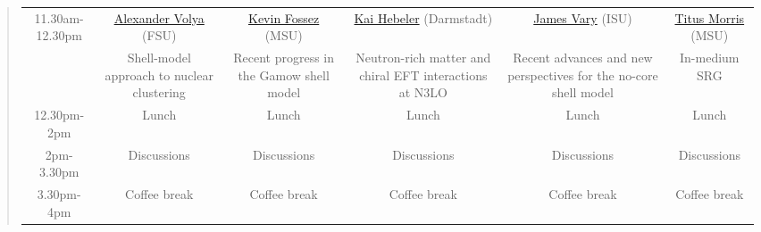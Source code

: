\documentclass[%
twoside,                 %
final,                   %
10pt]{article}
\begin{document}
\begin{quote}
\begin{tabular}{cccccc}
\hline
11.30am-12.30pm & \href{{http://www.physics.fsu.edu/people/Personnel.asp?fn=Alexander&ln=Volya&mn=}}{Alexander Volya} (FSU) & \href{{http://nscl.msu.edu/directory/index.php?initial=F}}{Kevin Fossez} (MSU)            & \href{{http://theorie.ikp.physik.tu-darmstadt.de/strongint/people_hebeler.html}}{Kai Hebeler} (Darmstadt) & \href{{http://www.public.iastate.edu/~jvary/}}{James Vary} (ISU)                & \href{{http://www.pa.msu.edu/profile/morri502}}{Titus Morris} (MSU)                                    \\
                & Shell-model approach to nuclear clustering                                                                & Recent progress in the Gamow shell model                                                  & Neutron-rich matter and chiral EFT interactions at N3LO                                                   & Recent advances and new perspectives for the no-core shell model                & In-medium SRG                                                                                          \\
\hline
12.30pm-2pm     & Lunch                                                                                                     & Lunch                                                                                     & Lunch                                                                                                     & Lunch                                                                           & Lunch                                                                                                  \\
\hline
2pm-3.30pm      & Discussions                                                                                               & Discussions                                                                               & Discussions                                                                                               & Discussions                                                                     & Discussions                                                                                            \\
\hline
3.30pm-4pm      & Coffee break                                                                                              & Coffee break                                                                              & Coffee break                                                                                              & Coffee break                                                                    & Coffee break                                                                                           \\

\end{tabular}
\end{quote}
\end{document}

